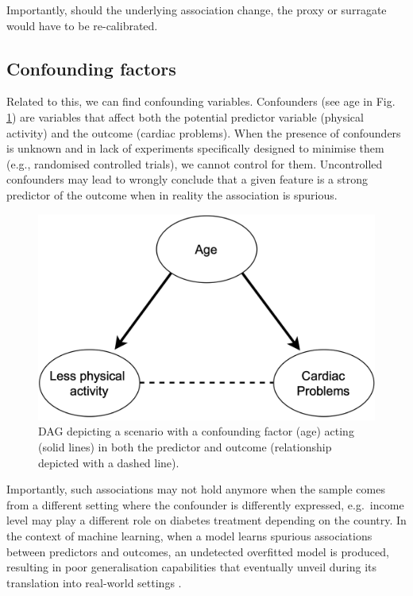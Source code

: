 \documentclass[
]{book}
\begin{document}
Importantly, should the underlying association change, the proxy or surragate would have to be re-calibrated.

\hypertarget{confounding-factors}{%
\subsection{Confounding factors}\label{confounding-factors}}

Related to this, we can find confounding variables. Confounders (see age in Fig. \ref{fig:cibb-confounding}) are variables that affect both the potential predictor variable (physical activity) and the outcome (cardiac problems). When the presence of confounders is unknown and in lack of experiments specifically designed to minimise them (e.g., randomised controlled trials), we cannot control for them. Uncontrolled confounders may lead to wrongly conclude that a given feature is a strong predictor of the outcome when in reality the association is spurious.

\begin{figure}

{\centering \includegraphics[width=0.5\linewidth]{Figures/CIBB_confounding} 

}

\caption{DAG depicting a scenario with a confounding factor (age) acting (solid lines) in both the predictor and outcome (relationship depicted with a dashed line).}\label{fig:cibb-confounding}
\end{figure}

Importantly, such associations may not hold anymore when the sample comes from a different setting where the confounder is differently expressed, e.g.~income level may play a different role on diabetes treatment depending on the country. In the context of machine learning, when a model learns spurious associations between predictors and outcomes, an undetected overfitted model is produced, resulting in poor generalisation capabilities that eventually unveil during its translation into real-world settings \citep{garcia2021need}.
\end{document}
